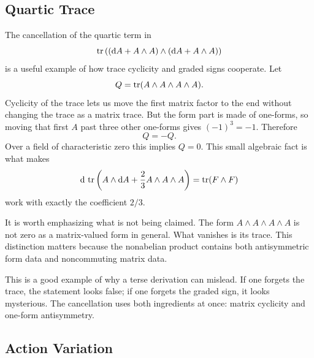 \subsection{Quartic Trace}
\label{subsec:dense-quartic-zero}

The cancellation of the quartic term in
\begin{equation}
  \operatorname{tr}\left((\mathrm{d} A+A\wedge A)\wedge(\mathrm{d} A+A\wedge A)\right)
  \label{eq:dense-ff-quartic-context}
\end{equation}
is a useful example of how trace cyclicity and graded signs cooperate. Let
\begin{equation}
  Q=\operatorname{tr}(A\wedge A\wedge A\wedge A).
  \label{eq:dense-quartic-Q}
\end{equation}
Cyclicity of the trace lets us move the first matrix factor to the end without changing the trace as a matrix trace. But the form part is made of one-forms, so moving that first $A$ past three other one-forms gives $(-1)^3=-1$. Therefore
\begin{equation}
  Q
  =
  -Q.
  \label{eq:dense-quartic-sign}
\end{equation}
Over a field of characteristic zero this implies $Q=0$. This small algebraic fact is what makes
\begin{equation}
  \mathrm{d}\,\operatorname{tr}\left(A\wedge\mathrm{d} A+\frac23A\wedge A\wedge A\right)
  =
  \operatorname{tr}(F\wedge F)
  \label{eq:dense-transgression-recalled}
\end{equation}
work with exactly the coefficient $2/3$.

It is worth emphasizing what is not being claimed. The form $A\wedge A\wedge A\wedge A$ is not zero as a matrix-valued form in general. What vanishes is its trace. This distinction matters because the nonabelian product contains both antisymmetric form data and noncommuting matrix data.

This is a good example of why a terse derivation can mislead. If one forgets the trace, the statement looks false; if one forgets the graded sign, it looks mysterious. The cancellation uses both ingredients at once: matrix cyclicity and one-form antisymmetry.

\subsection{Action Variation}
\label{subsec:dense-full-variation}

